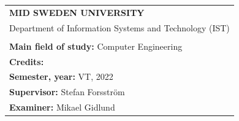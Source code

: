 \begin{titlepage}
  \setlength\headheight{60pt}
  \renewcommand{\headrulewidth}{0pt}
  \thispagestyle{fancy}
  \fancyhf{}
  \fancyfoot{}
    \vspace*{0.5cm}
    {\selectfont{%
    	\Large{\textbf{\gettitle}}}
      \\
      \\
      \large{} %
    \\
    \\
    \\
    	\large{\getauthor}}
    \vspace*{13cm}

    \renewcommand{\arraystretch}{0.5}
    \begin{tabular}{l}
    \footnotesize{\textbf{MID SWEDEN UNIVERSITY}}\\
    \footnotesize{Department of Information Systems and Technology (IST)}\\
          \\

      \footnotesize{\textbf{Main field of study:} Computer Engineering }\\
      \footnotesize{\textbf{Credits:}  }\\
      \footnotesize{\textbf{Semester, year:} VT, 2022}\\
      \footnotesize{\textbf{Supervisor:} Stefan Forsström}\\
      \footnotesize{\textbf{Examiner:} Mikael Gidlund}\\
    \end{tabular}
  \end{titlepage}
